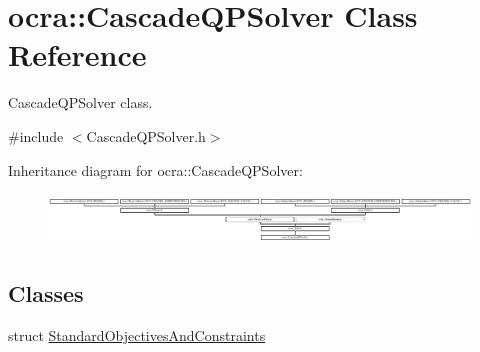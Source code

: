 \hypertarget{classocra_1_1CascadeQPSolver}{}\section{ocra\+:\+:Cascade\+Q\+P\+Solver Class Reference}
\label{classocra_1_1CascadeQPSolver}


Cascade\+Q\+P\+Solver class.  




{\ttfamily \#include $<$Cascade\+Q\+P\+Solver.\+h$>$}

Inheritance diagram for ocra\+:\+:Cascade\+Q\+P\+Solver\+:\begin{figure}[H]
\begin{center}
\leavevmode
\includegraphics[height=1.352657cm]{d6/d35/classocra_1_1CascadeQPSolver}
\end{center}
\end{figure}
\subsection*{Classes}
\begin{DoxyCompactItemize}
\item 
struct \hyperlink{structocra_1_1CascadeQPSolver_1_1StandardObjectivesAndConstraints}{Standard\+Objectives\+And\+Constraints}
\end{DoxyCompactItemize}
